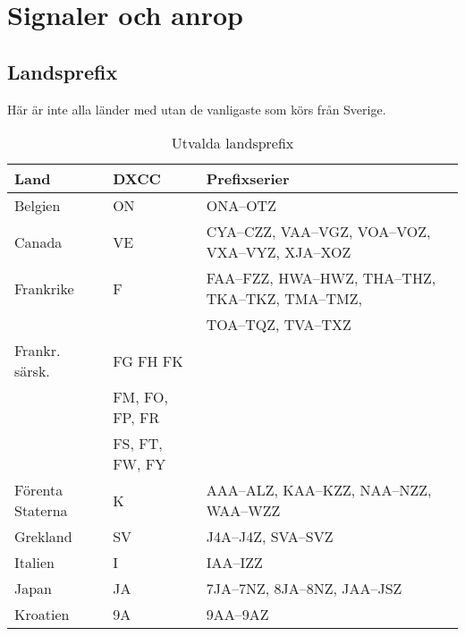 \section{Signaler och anrop}
\subsection{Landsprefix}

Här är inte alla länder med utan de vanligaste som körs från Sverige.

\begin{center}
	\begin{footnotesize}
		\begin{longtable}{lll}
			\caption{Utvalda landsprefix} \\
			\textbf{Land}                 & \textbf{DXCC}  & \textbf{Prefixserier}                             \\ \hline
			Belgien                       & ON             & ONA--OTZ                                          \\
			Canada                        & VE             & CYA--CZZ, VAA--VGZ, VOA--VOZ, VXA--VYZ, XJA--XOZ  \\
			Frankrike                     & F              & FAA--FZZ, HWA--HWZ, THA--THZ, TKA--TKZ, TMA--TMZ, \\
			                              &                & TOA--TQZ, TVA--TXZ                                \\
			Frankr. särsk.                & FG FH FK       &                                                   \\
			                              & FM, FO, FP, FR &                                                   \\
			                              & FS, FT, FW, FY &                                                   \\
			Förenta Staterna              & K              & AAA--ALZ, KAA--KZZ, NAA--NZZ, WAA--WZZ            \\
			Grekland                      & SV             & J4A--J4Z, SVA--SVZ                                \\
			Italien                       & I              & IAA--IZZ                                          \\
			Japan                         & JA             & 7JA--7NZ, 8JA--8NZ, JAA--JSZ                      \\
			Kroatien                      & 9A             & 9AA--9AZ                                          \\

\end{longtable}
\end{footnotesize}
\end{center}
